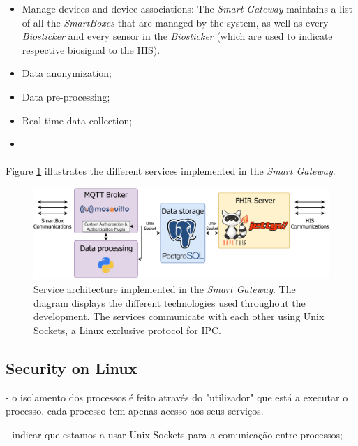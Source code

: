 \begin{itemize}
    \item Manage devices and device associations: The \textit{Smart Gateway} maintains a list of all the \textit{SmartBoxes} that are managed by the system, as well as every \textit{Biosticker} and every sensor in the \textit{Biosticker} (which are used to indicate respective biosignal to the \acs{HIS}). 
    \item Data anonymization;
    \item Data pre-processing;
    \item Real-time data collection;
    \item 
\end{itemize}

\paragraph{} Figure \ref{fig:gateway_serviceoverview} illustrates the different services implemented in the \textit{Smart Gateway}.

\begin{figure}[H]
    \centering
    \includegraphics[width=\linewidth]{images/service overview gateway.pdf}
    \caption[Service architecture implemented in the \textit{Smart Gateway}.]{Service architecture implemented in the \textit{Smart Gateway}. The diagram displays the different technologies used throughout the development. The services communicate with each other using Unix Sockets, a Linux exclusive protocol for \acf{IPC}.}
    \label{fig:gateway_serviceoverview}
\end{figure}


\subsection{Security on Linux}
- o isolamento dos processos é feito através do "utilizador" que está a executar o processo. cada processo tem apenas acesso aos seus serviços.

- indicar que estamos a usar Unix Sockets para a comunicação entre processos;

